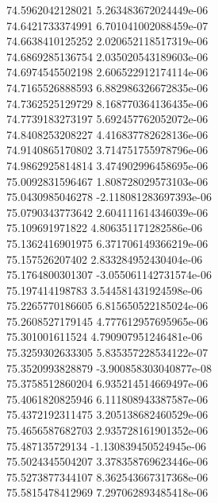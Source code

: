 {74.5962042128021 5.263483672024449e-06 \\
74.6421733374991 6.701041002088459e-07 \\
74.6638410125252 2.020652118517319e-06 \\
74.6869285136754 2.035020543189603e-06 \\
74.6974545502198 2.606522912174114e-06 \\
74.7165526888593 6.882986326672835e-06 \\
74.7362525129729 8.168770364136435e-06 \\
74.7739183273197 5.692457762052072e-06 \\
74.8408253208227 4.416837782628136e-06 \\
74.9140865170802 3.714751755978796e-06 \\
74.9862925814814 3.474902996458695e-06 \\
75.0092831596467 1.808728029573103e-06 \\
75.0430985046278 -2.118081283697393e-06 \\
75.0790343773642 2.604111614346039e-06 \\
75.109691971822 4.806351171282586e-06 \\
75.1362416901975 6.371706149366219e-06 \\
75.157526207402 2.833284952430404e-06 \\
75.1764800301307 -3.055061142731574e-06 \\
75.197414198783 3.544581431924598e-06 \\
75.2265770186605 6.815650522185024e-06 \\
75.2608527179145 4.777612957695965e-06 \\
75.301001611524 4.790907951246481e-06 \\
75.3259302633305 5.835357228534122e-07 \\
75.3520993828879 -3.900858303040877e-08 \\
75.3758512860204 6.935214514669497e-06 \\
75.4061820825946 6.111808943387587e-06 \\
75.4372192311475 3.205138682460529e-06 \\
75.4656587682703 2.935728161901352e-06 \\
75.487135729134 -1.130839450524945e-06 \\
75.5024345504207 3.378358769623446e-06 \\
75.5273877344107 8.362543667317368e-06 \\
75.5815478412969 7.297062893485418e-06 \\
}
